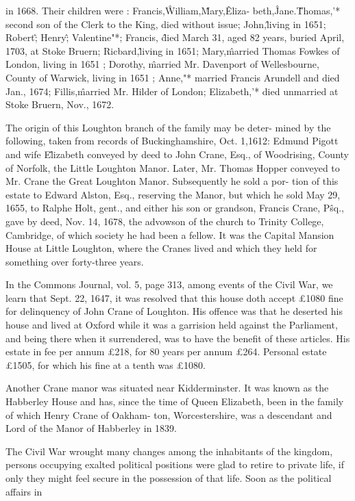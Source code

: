 \documentclass{book}
\begin{document}
in 1668. Their children were : Francis,\^ William,\^ Mary,\^ Eliza- 
beth,\^ Jane.\^ Thomas,'* second son of the Clerk to the King, 
died without issue; John,\^ living in 1651; Robert\^ ; Henry\^ ; 
Valentine"*; Francis, \^ died March 31, aged 82 years, buried 
April, 1703, at Stoke Bruern; Ricbard,\^ living in 1651; Mary,\^ 
married Thomas Fowkes of London, living in 1651 ; Dorothy, \^ 
married Mr. Davenport of Wellesbourne, County of Warwick, 
living in 1651 ; Anne,"* married Francis Arundell and died Jan., 
1674; Fillis,\^ married Mr. Hilder of London; Elizabeth,'* died 
unmarried at Stoke Bruern, Nov., 1672. 

The origin of this Loughton branch of the family may be deter- 
mined by the following, taken from records of Buckinghamshire, 
Oct. 1,1612: Edmund Pigott and wife E\^lizabeth conveyed by deed 
to John Crane, Esq., of Woodrising, County of Norfolk, the Little 
Loughton Manor. Later, Mr. Thomas Hopper conveyed to Mr. 
Crane the Great Loughton Manor. Subsequently he sold a por- 
tion of this estate to Edward Alston, Esq., reserving the Manor, 
but which he sold May 29, 1655, to Ralphe Holt, gent., and 
either his son or grandson, Francis Crane, P\^sq., gave by deed, 
Nov. 14, 1678, the advowson of the church to Trinity College, 
Cambridge, of which society he had been a fellow. It was the 
Capital Mansion House at Little Loughton, where the Cranes 
lived and which they held for something over forty-three years. 

In the Commons Journal, vol. 5, page 313, among events of the 
Civil War, we learn that Sept. 22, 1647, it was resolved that this 
house doth accept £1080 fine for delinquency of John Crane of 
Loughton. His offence was that he deserted his house and lived 
at Oxford while it was a garrision held against the Parliament, 
and being there when it surrendered, was to have the benefit of 
these articles. His estate in fee per annum £218, for 80 years 
per annum £264. Personal estate £1505, for which his fine at a 
tenth was £1080. 

Another Crane manor was situated near Kidderminster. It was 
known as the Habberley House and has, since the time of Queen 
Elizabeth, been in the family of which Henry Crane of Oakham- 
ton, Worcestershire, was a descendant and Lord of the Manor of 
Habberley in 1839. 

The Civil War wrought many changes among the inhabitants 
of the kingdom, persons occupying exalted political positions 
were glad to retire to private life, if only they might feel secure 
in the possession of that life. Soon as the political affairs in 
\end{document}

